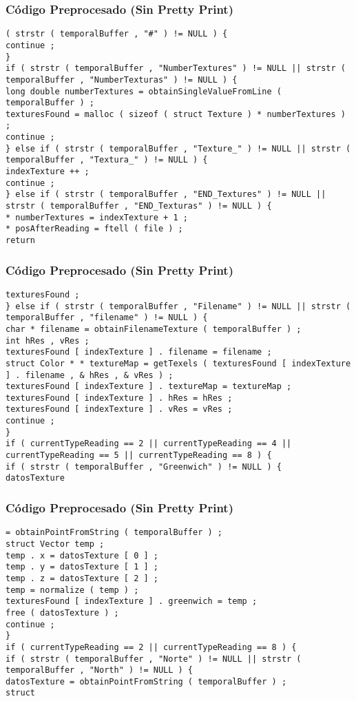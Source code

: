 \documentclass{beamer}
\begin{document}
\begin{frame}[fragile]
\frametitle{C\'odigo Preprocesado (Sin Pretty Print)}
\begin{lstlisting}[style=CStyle]
( strstr ( temporalBuffer , "#" ) != NULL ) { 
continue ; 
} 
if ( strstr ( temporalBuffer , "NumberTextures" ) != NULL || strstr ( temporalBuffer , "NumberTexturas" ) != NULL ) { 
long double numberTextures = obtainSingleValueFromLine ( temporalBuffer ) ; 
texturesFound = malloc ( sizeof ( struct Texture ) * numberTextures ) ; 
continue ; 
} else if ( strstr ( temporalBuffer , "Texture_" ) != NULL || strstr ( temporalBuffer , "Textura_" ) != NULL ) { 
indexTexture ++ ; 
continue ; 
} else if ( strstr ( temporalBuffer , "END_Textures" ) != NULL || strstr ( temporalBuffer , "END_Texturas" ) != NULL ) { 
* numberTextures = indexTexture + 1 ; 
* posAfterReading = ftell ( file ) ; 
return \end{lstlisting}
\end{frame}
\begin{frame}[fragile]
\frametitle{C\'odigo Preprocesado (Sin Pretty Print)}
\begin{lstlisting}[style=CStyle]
texturesFound ; 
} else if ( strstr ( temporalBuffer , "Filename" ) != NULL || strstr ( temporalBuffer , "filename" ) != NULL ) { 
char * filename = obtainFilenameTexture ( temporalBuffer ) ; 
int hRes , vRes ; 
texturesFound [ indexTexture ] . filename = filename ; 
struct Color * * textureMap = getTexels ( texturesFound [ indexTexture ] . filename , & hRes , & vRes ) ; 
texturesFound [ indexTexture ] . textureMap = textureMap ; 
texturesFound [ indexTexture ] . hRes = hRes ; 
texturesFound [ indexTexture ] . vRes = vRes ; 
continue ; 
} 
if ( currentTypeReading == 2 || currentTypeReading == 4 || currentTypeReading == 5 || currentTypeReading == 8 ) { 
if ( strstr ( temporalBuffer , "Greenwich" ) != NULL ) { 
datosTexture \end{lstlisting}
\end{frame}
\begin{frame}[fragile]
\frametitle{C\'odigo Preprocesado (Sin Pretty Print)}
\begin{lstlisting}[style=CStyle]
= obtainPointFromString ( temporalBuffer ) ; 
struct Vector temp ; 
temp . x = datosTexture [ 0 ] ; 
temp . y = datosTexture [ 1 ] ; 
temp . z = datosTexture [ 2 ] ; 
temp = normalize ( temp ) ; 
texturesFound [ indexTexture ] . greenwich = temp ; 
free ( datosTexture ) ; 
continue ; 
} 
if ( currentTypeReading == 2 || currentTypeReading == 8 ) { 
if ( strstr ( temporalBuffer , "Norte" ) != NULL || strstr ( temporalBuffer , "North" ) != NULL ) { 
datosTexture = obtainPointFromString ( temporalBuffer ) ; 
struct \end{lstlisting}
\end{frame}
\end{document}
